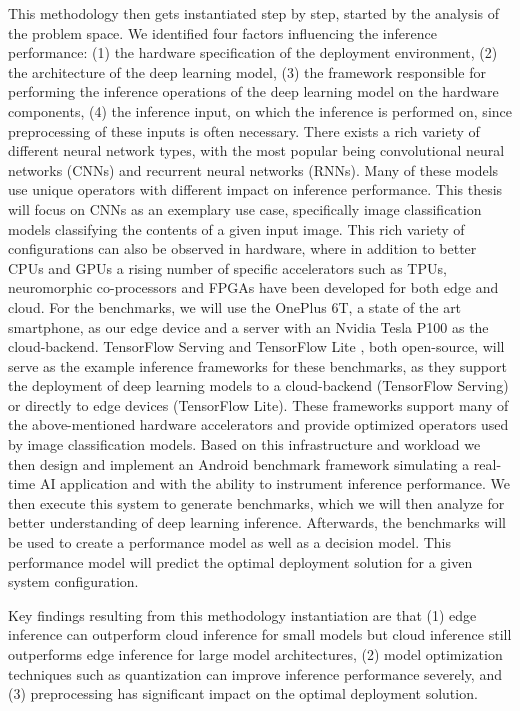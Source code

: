 This methodology then gets instantiated step by step, started by the analysis of the problem space.
We identified four factors influencing the inference performance: (1) the hardware specification of the deployment environment, (2) the architecture of the deep learning model, (3) the framework responsible for performing the inference operations of the deep learning model on the hardware components, (4) the inference input, on which the inference is performed on, since preprocessing of these inputs is often necessary.
There exists a rich variety of different neural network types, with the most popular being convolutional neural networks (CNNs) and recurrent neural networks (RNNs).
Many of these models use unique operators with different impact on inference performance.
This thesis will focus on CNNs as an exemplary use case, specifically image classification models classifying the contents of a given input image.
This rich variety of configurations can also be observed in hardware, where in addition to better CPUs and GPUs a rising number of specific accelerators such as TPUs, neuromorphic co-processors and FPGAs have been developed for both edge and cloud.
For the benchmarks, we will use the OnePlus 6T, a state of the art smartphone, as our edge device and a server with an Nvidia Tesla P100 as the cloud-backend.
TensorFlow Serving \cite{tfServing} and TensorFlow Lite \cite{tfLite}, both open-source, will serve as the example inference frameworks for these benchmarks, as they support the deployment of deep learning models to a cloud-backend (TensorFlow Serving) or directly to edge devices (TensorFlow Lite). These frameworks support many of the above-mentioned hardware accelerators and provide optimized operators used by image classification models.
Based on this infrastructure and workload we then design and implement an Android benchmark framework simulating a real-time AI application and with the ability to instrument inference performance.
We then execute this system to generate benchmarks, which we will then analyze for better understanding of deep learning inference. Afterwards, the benchmarks will be used to create a performance model as well as a decision model.
This performance model will predict the optimal deployment solution for a given system configuration.

Key findings resulting from this methodology instantiation are that (1) edge inference can outperform cloud inference for small models but cloud inference still outperforms edge inference for large model architectures, (2) model optimization techniques such as quantization can improve inference performance severely, and (3) preprocessing has significant impact on the optimal deployment solution.

